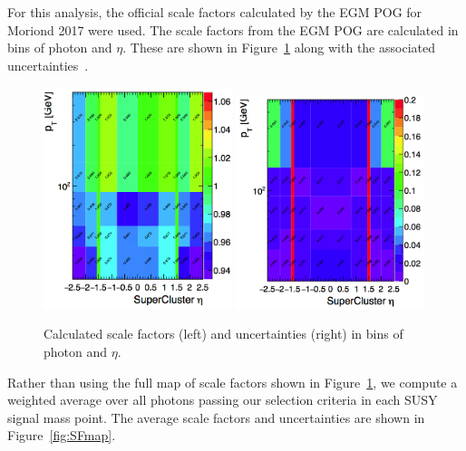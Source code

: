 For this analysis, the official
scale factors calculated by the EGM POG for Moriond 2017 were used.
The scale factors from the EGM POG are calculated in bins of photon \pt and
$\eta$. These are shown in Figure~\ref{fig:SF} along with the
associated uncertainties~\cite{SF_twiki}.

\begin{figure}[htbp]
    \centering
    \includegraphics[width=0.49\textwidth]{Figures/EventSelect/scalefactors.png}
    \includegraphics[width=0.49\textwidth]{Figures/EventSelect/sf_errors.png}
    \caption[Calculated scale factors and uncertainties 
      in bins of photon \pt and $\eta$.]
    {Calculated scale factors (left) and uncertainties (right)
      in bins of photon \pt and $\eta$.}
    \label{fig:SF}
\end{figure}

Rather than using the full map of scale factors shown in Figure~\ref{fig:SF},
we compute a weighted average over all photons passing our selection criteria
in each SUSY signal mass point.
The average scale factors and uncertainties are shown in Figure~\ref{fig:SFmap}.

